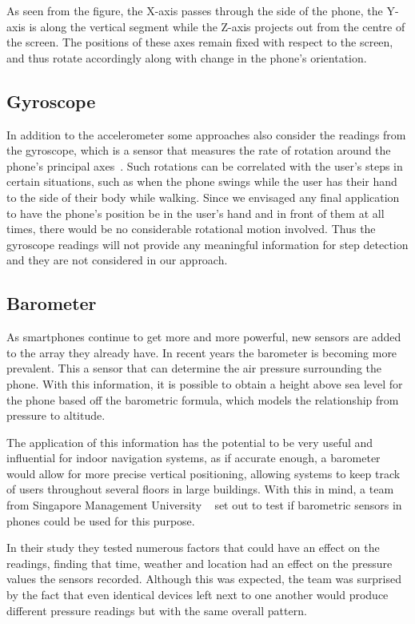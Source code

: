 \documentclass[12pt,a4paper]{report}
\begin{document}
As seen from the figure, the X-axis passes through the side of the phone, the Y-axis is along the vertical segment while the Z-axis projects out from the centre of the screen. The positions of these axes remain fixed with respect to the screen, and thus rotate accordingly along with change in the phone's orientation. 

\subsection{Gyroscope}
In addition to the accelerometer some approaches also consider the readings from the gyroscope, which is a sensor that measures the rate of rotation around the phone's principal axes~\cite{accelerometerAcceleration}. Such rotations can be correlated with the user's steps in certain situations, such as when the phone swings while the user has their hand to the side of their body while walking. Since we envisaged any final application to have the phone's position be in the user's hand and in front of them at all times, there would be no considerable rotational motion involved. Thus the gyroscope readings will not provide any meaningful information for step detection and they are not considered in our approach. 

\subsection{Barometer}

As smartphones continue to get more and more powerful, new sensors are added to the array they already have. In recent years the barometer is becoming more prevalent. This a sensor that can determine the air pressure surrounding the phone. With this information, it is possible to obtain a height above sea level for the phone based off the barometric formula, which models the relationship from pressure to altitude.

The application of this information has the potential to be very useful and influential for indoor navigation systems, as if accurate enough, a barometer would allow for more precise vertical positioning, allowing systems to keep track of users throughout several floors in large buildings. With this in mind, a team from Singapore Management University ~\cite{baro2014} set out to test if barometric sensors in phones could be used for this purpose.

In their study they tested numerous factors that could have an effect on the readings, finding that  time, weather and location had an effect on the pressure values the sensors recorded. Although this was expected, the team was surprised by the fact that even identical devices left next to one another would produce different pressure readings but with the same overall pattern. ~\cite[p.2]{baro2014}
\end{document}
